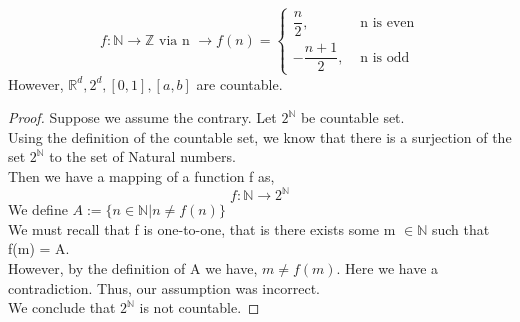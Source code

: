 \documentclass[letterpaper, 12pt]{article}
\newcommand{\1}{\mathds{1}}	%
\theoremstyle{definition}
\begin{document}
{
\[f: \mathbb{N} \to \mathbb{Z} \text{ via n } \to f(n) = \begin{cases}
    \dfrac{n}{2}, & \text{ n is even} \\
    -\dfrac{n+1}{2}, & \text{ n is odd}
\end{cases}\]
However, $\mathbb{R}^d, 2^d, [0, 1], [a, b]$ are countable.

\begin{proof}
    Suppose we assume the contrary. Let $2^{\mathbb{N}}$ be countable set. \\
    Using the definition of the countable set, we know that there is a surjection of the set $2^{\mathbb{N}}$ to the set of Natural numbers. \\
    Then we have a mapping of a function f as, \[f: \mathbb{N} \to 2^{\mathbb{N}}\]
    We define $A := \{n \in \mathbb{N} | n \neq f(n)\}$ \\
    We must recall that f is one-to-one, that is there exists some m $\in \mathbb{N}$ such that f(m) = A. \\
    However, by the definition of A we have, $m \neq f(m)$.
    Here we have a contradiction. Thus, our assumption was incorrect. \\
    We conclude that $2^{\mathbb{N}}$ is not countable.
\end{proof}

}
\end{document}
